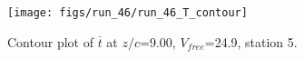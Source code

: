 \begin{figure}[H]
\centering
\texttt{[image: figs/run\_46/run\_46\_T\_contour]}
\caption{Contour plot of $\overline{t}$ at $z/c$=9.00, $V_{free}$=24.9, station 5.}
\label{fig:run_46_T_contour}
\end{figure}


